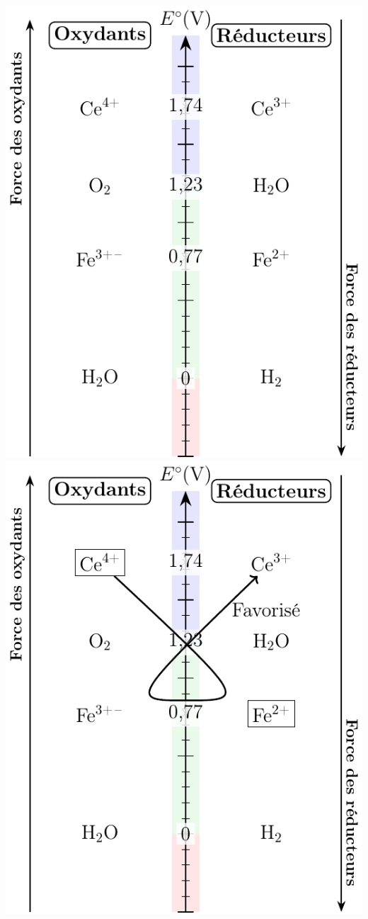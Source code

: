 \documentclass[../../main/main.tex]{subfiles}
\begin{document}
\begin{tcb*}[sidebyside, righthand ratio=.25]
\begin{center}
{          \includegraphics[width=\linewidth]{estand_fece-plain}
    }{
    \includegraphics[width=\linewidth]{estand_fece}
}
\end{center}
\end{tcb*}
\end{document}
